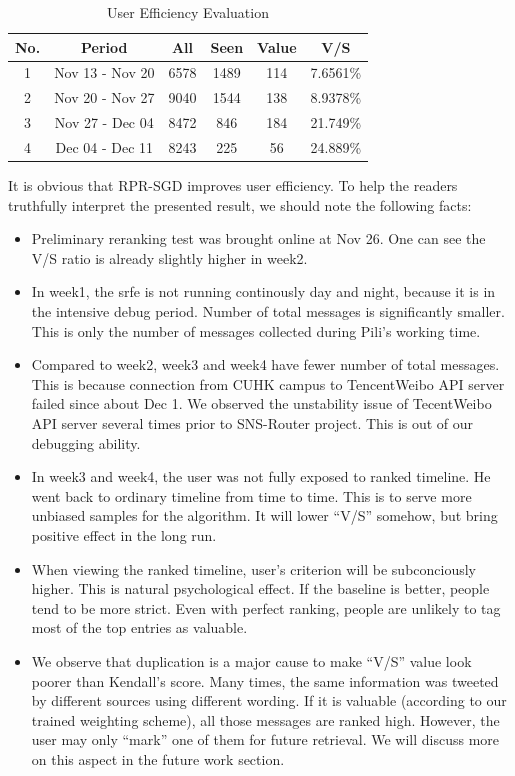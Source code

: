 \documentclass{sig-alternate}
\begin{document}
\begin{table}[htb]
	\centering
	\caption{User Efficiency Evaluation}
	\label{tbl:user_eff}
	\begin{tabular}{c|c|c|c|c|c}
		\hline
		No. & Period & All & Seen & Value & V/S \\
		\hline
		1 & Nov 13 - Nov 20 & 6578 & 1489 & 114 & 7.6561\% \\
		2 & Nov 20 - Nov 27 & 9040 & 1544 & 138 & 8.9378\% \\
		3 & Nov 27 - Dec 04 & 8472 & 846 & 184 & 21.749\% \\
		4 & Dec 04 - Dec 11 & 8243 & 225 & 56 & 24.889\% \\
		\hline
	\end{tabular}
\end{table}

It is obvious that RPR-SGD improves user efficiency. 
To help the readers truthfully interpret the presented result, 
we should note the following facts:
\begin{itemize}
	\item Preliminary reranking test was brought online at Nov 26. 
		One can see the V/S ratio is already slightly higher in week2. 
	\item In week1, the \gls{srfe} is not running continously day and night, 
		because it is in the intensive debug period. 
		Number of total messages is significantly smaller. 
		This is only the number of messages collected during Pili's working time. 
	\item Compared to week2, week3 and week4 have fewer number of total messages. 
		This is because connection from CUHK campus to TencentWeibo API server failed since about Dec 1. 
		We observed the unstability issue of TecentWeibo API server several times 
		prior to SNS-Router project. 
		This is out of our debugging ability. 
	\item In week3 and week4, the user was not fully exposed to ranked timeline. 
		He went back to ordinary timeline from time to time. 
		This is to serve more unbiased samples for the algorithm. 
		It will lower ``V/S'' somehow, but bring positive effect in the long run. 
	\item When viewing the ranked timeline, user's criterion will be subconciously higher. 
		This is natural psychological effect. 
		If the baseline is better, people tend to be more strict. 
		Even with perfect ranking, people are unlikely to tag
		most of the top entries as valuable. 
	\item We observe that duplication is a major cause to make ``V/S'' 
		value look poorer than Kendall's score. 
		Many times, the same information was tweeted by different sources using different wording. 
		If it is valuable (according to our trained weighting scheme), 
		all those messages are ranked high. 
		However, the user may only ``mark'' one of them for future retrieval. 
		We will discuss more on this aspect in the future work section. 
\end{itemize}
\end{document}
